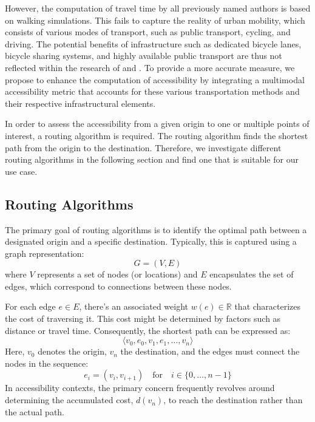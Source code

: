 However, the computation of travel time by all previously named authors is based on walking simulations. 
This fails to capture the reality of urban mobility, which consists of various modes of transport, such as public transport, cycling, and driving.
The potential benefits of infrastructure such as dedicated bicycle lanes, bicycle sharing systems, and highly available public transport are thus not reflected within the research of \cite{olivariAreItalianCities2023} and \cite{nicolettiDisadvantagedCommunitiesHave2023}.
To provide a more accurate measure, we propose to enhance the computation of accessibility by integrating a multimodal accessibility metric that accounts for these various transportation methods and their respective infrastructural elements.


In order to assess the accessibility from a given origin to one or multiple points of interest, a routing algorithm is required.
The routing algorithm finds the shortest path from the origin to the destination.
Therefore, we investigate different routing algorithms in the following section and find one that is suitable for our use case.

\subsection{Routing Algorithms}
\label{subsec:routing_algorithms}

The primary goal of routing algorithms is to identify the optimal path between a designated origin and a specific destination.
Typically, this is captured using a graph representation:
\[ G = (V, E) \]
where $V$ represents a set of nodes (or locations) and $E$ encapsulates the set of edges, which correspond to connections between these nodes.

For each edge \( e \in E \), there's an associated weight \( w(e) \in \mathbb{R} \) that characterizes the cost of traversing it.
This cost might be determined by factors such as distance or travel time.
Consequently, the shortest path can be expressed as:
\[ \langle v_0, e_0, v_1, e_1, \dots, v_n \rangle \]
Here, \( v_0 \) denotes the origin, \( v_n \) the destination, and the edges must connect the nodes in the sequence:
\[ e_i = (v_i, v_{i+1}) \quad \text{for} \quad i \in \{0, \dots, n-1\} \]
In accessibility contexts, the primary concern frequently revolves around determining the accumulated cost, \( d(v_n) \), to reach the destination rather than the actual path.

